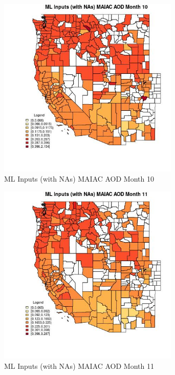 \begin{figure} 
\centering  
\includegraphics[width=0.77\textwidth]{Code_Outputs/Report_ML_input_PM25_Step4_part_f_de_duplicated_aves_prioritize_24hr_obswNAs_CountyMAIAC_AODmedianMonth10.jpg} 
\caption{\label{fig:Report_ML_input_PM25_Step4_part_f_de_duplicated_aves_prioritize_24hr_obswNAsCountyMAIAC_AODmedianMonth10}ML Inputs (with NAs) MAIAC AOD Month 10} 
\end{figure} 
 

\begin{figure} 
\centering  
\includegraphics[width=0.77\textwidth]{Code_Outputs/Report_ML_input_PM25_Step4_part_f_de_duplicated_aves_prioritize_24hr_obswNAs_CountyMAIAC_AODmedianMonth11.jpg} 
\caption{\label{fig:Report_ML_input_PM25_Step4_part_f_de_duplicated_aves_prioritize_24hr_obswNAsCountyMAIAC_AODmedianMonth11}ML Inputs (with NAs) MAIAC AOD Month 11} 
\end{figure} 
 

